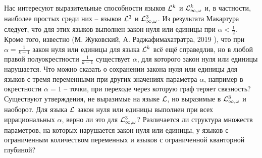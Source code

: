 Нас интересуют выразительные способности языков $\mathcal{L}^k$ и $\mathcal{L}^k_{\infty, \omega}$ и, в частности, наиболее простых среди них -- языков  $\mathcal{L}^3$ и $\mathcal{L}^3_{\infty, \omega}$.
Из результата Макартура следует, что для этих языков выполнен закон нуля или единицы при $\alpha < \frac{1}{2}$.
Кроме того, известно (М. Жуковский, А. Раджафимахатратра, 2019 \cite{razafimahatratra2019zero}), что при $\alpha = \frac{1}{k-1}$ закон нуля или единицы для языка $\mathcal{L}^k$ всё ещё справедлив, но в любой правой полуокрестности $\frac{1}{k-1}$ существует $\alpha$, для которого закон нуля или единицы нарушается.
Что можно сказать о сохранении закона нуля или единицы для языков с тремя переменными при других значениях параметра $\alpha$, например в окрестности $\alpha=1$ -- точки, при переходе через которую граф теряет связность?
Существуют утверждения, не выразимые на языке $\mathcal{L}$, но выразимые в $\mathcal{L}^3_{\infty, \omega}$ и наоборот.
Для языка $\mathcal{L}$ закон нуля или единицы выполнен при всех иррациональных $\alpha$, верно ли это для $\mathcal{L}^3_{\infty, \omega}$?
Различается ли структура множеств параметров, на которых нарушается закон нуля или единицы, у языков с ограниченным количеством переменных и языков с ограниченной кванторной глубиной? 
